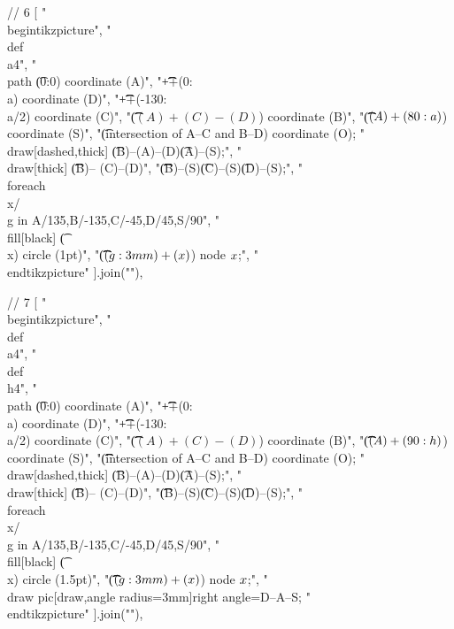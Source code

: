 // 6
[
"\\begin{tikzpicture}",
"\t\\def\\a{4}",
"\t\\path \t(0:0) coordinate (A)",
"\t\t\t++(0:\\a) coordinate (D)",
"\t\t\t++(-130:\\a/2) coordinate (C)",
"\t\t\t($(A)+(C)-(D)$) coordinate (B)",
"\t\t\t($(A)+(80:\\a)$) coordinate (S)",
"\t(intersection of A--C and B--D) coordinate (O);%
"\t\\draw[dashed,thick] \t(B)--(A)--(D)\t(A)--(S);",
"\t\\draw[thick] \t\t\t(B)-- (C)--(D)",
"\t\t\t\t\t(B)--(S)\t(C)--(S)\t(D)--(S);",
"\t\\foreach \\x/\\g in {A/135,B/-135,C/-45,D/45,S/90}",
"\t\t\t\\fill[black] \t(\\x) circle (1pt)",
"\t\t\t($(\\g:3mm)+(\\x)$) node {$\\x$};",
"\\end{tikzpicture}"
].join("\n"),

// 7
[
"\\begin{tikzpicture}",
"\t\\def\\a{4}",
"\t\\def\\h{4}",
"\t\\path \t(0:0) coordinate (A)",
"\t\t\t++(0:\\a) coordinate (D)",
"\t\t\t++(-130:\\a/2) coordinate (C)",
"\t\t\t($(A)+(C)-(D)$) coordinate (B)",
"\t\t\t($(A)+(90:\\h)$) coordinate (S)",
"\t\t\t(intersection of A--C and B--D) coordinate (O);%
"\t\\draw[dashed,thick] \t(B)--(A)--(D)\t(A)--(S);",
"\t\\draw[thick] \t\t\t(B)-- (C)--(D)",
"\t\t\t(B)--(S)\t(C)--(S)\t(D)--(S);",
"\t\\foreach \\x/\\g in {A/135,B/-135,C/-45,D/45,S/90}",
"\t\t\t\\fill[black] \t(\\x) circle (1.5pt)",
"\t\t\t($(\\g:3mm)+(\\x)$) node {$\\x$};",
"\t\\draw pic[draw,angle radius=3mm]{right angle=D--A--S};%
"\\end{tikzpicture}"
].join("\n"),

